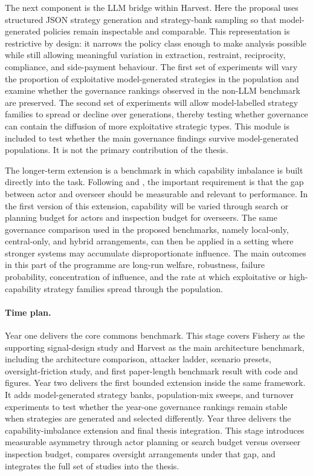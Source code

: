 \documentclass[10pt]{article}
\begin{document}
The next component is the LLM bridge within Harvest. Here the proposal uses structured JSON strategy generation and strategy-bank sampling so that model-generated policies remain inspectable and comparable. This representation is restrictive by design: it narrows the policy class enough to make analysis possible while still allowing meaningful variation in extraction, restraint, reciprocity, compliance, and side-payment behaviour. The first set of experiments will vary the proportion of exploitative model-generated strategies in the population and examine whether the governance rankings observed in the non-LLM benchmark are preserved. The second set of experiments will allow model-labelled strategy families to spread or decline over generations, thereby testing whether governance can contain the diffusion of more exploitative strategic types. This module is included to test whether the main governance findings survive model-generated populations. It is not the primary contribution of the thesis.

The longer-term extension is a benchmark in which capability imbalance is built directly into the task. Following \citet{bowman2022} and \citet{engels2025}, the important requirement is that the gap between actor and overseer should be measurable and relevant to performance. In the first version of this extension, capability will be varied through search or planning budget for actors and inspection budget for overseers. The same governance comparison used in the proposed benchmarks, namely local-only, central-only, and hybrid arrangements, can then be applied in a setting where stronger systems may accumulate disproportionate influence. The main outcomes in this part of the programme are long-run welfare, robustness, failure probability, concentration of influence, and the rate at which exploitative or high-capability strategy families spread through the population.

\paragraph{Time plan.} Year one delivers the core commons benchmark. This stage covers Fishery as the supporting signal-design study and Harvest as the main architecture benchmark, including the architecture comparison, attacker ladder, scenario presets, oversight-friction study, and first paper-length benchmark result with code and figures. Year two delivers the first bounded extension inside the same framework. It adds model-generated strategy banks, population-mix sweeps, and turnover experiments to test whether the year-one governance rankings remain stable when strategies are generated and selected differently. Year three delivers the capability-imbalance extension and final thesis integration. This stage introduces measurable asymmetry through actor planning or search budget versus overseer inspection budget, compares oversight arrangements under that gap, and integrates the full set of studies into the thesis.
\end{document}
